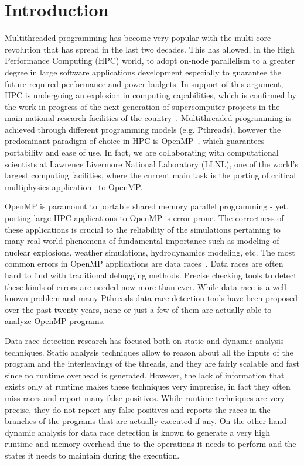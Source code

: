 \section{Introduction}
\label{sec:introduction}

Multithreaded programming has become very popular with the multi-core
revolution that has spread in the last two decades.
%
This has allowed, in the High Performance Computing (HPC) world, to adopt
on-node parallelism to a greater degree in large software applications
development especially to guarantee the future required performance and power
budgets.
%
In support of this argument, HPC is undergoing an explosion in
computing capabilities, which is confirmed by the work-in-progress of the
next-generation of supercomputer projects in the main national research
facilities of the country~\cite{sierra, summit, trinity}.
%
Multithreaded programming is achieved through different programming models
(e.g. Pthreads), however the predominant paradigm of choice in HPC is
OpenMP~\cite{ompdoc}, which guarantees portability and ease of use.
%
In fact, we are collaborating with computational scientists at Lawrence
Livermore National Laboratory (LLNL), one of the world's largest computing
facilities, where the current main task is the porting of critical
multiphysics application~\cite{llnl-apps} to OpenMP.

OpenMP is paramount to portable shared memory parallel programming - yet,
porting large HPC applications to OpenMP is error-prone.
%
The correctness of these applications is crucial to the reliability of the
simulations pertaining to many real world phenomena of fundamental importance
such as modeling of nuclear explosions, weather simulations, hydrodynamics
modeling, etc.
%
The most common errors in OpenMP applications are data
races~\cite{sus_common_2008}.
%
Data races are often hard to find with traditional debugging methods.
%
Precise checking tools to detect these kinds of errors are needed now more
than ever.
%
While data race is a well-known problem and many Pthreads data race detection
tools have been proposed over the past twenty years, none or just a few of
them are actually able to analyze OpenMP programs.

Data race detection research has focused both on static and dynamic analysis
techniques.
%
Static analysis techniques allow to reason about all the inputs of the program
and the interleavings of the threads, and they are fairly scalable and fast
since no runtime overhead is generated.
%
However, the lack of information that exists only at runtime makes these
techniques very imprecise, in fact they often miss races and report many false
positives.
%
While runtime techniques are very precise, they do not report any false
positives and reports the races in the branches of the programs that are
actually executed if any.
%
On the other hand dynamic analysis for data race detection is known to
generate a very high runtime and memory overhead due to the operations it
needs to perform and the states it needs to maintain during the execution.

